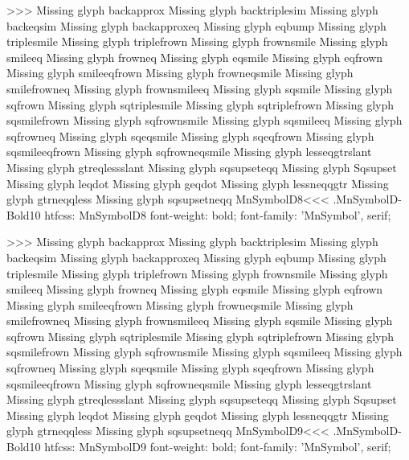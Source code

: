 >>>
Missing glyph	backapprox
Missing glyph	backtriplesim
Missing glyph	backeqsim
Missing glyph	backapproxeq
Missing glyph	eqbump
Missing glyph	triplesmile
Missing glyph	triplefrown
Missing glyph	frownsmile
Missing glyph	smileeq
Missing glyph	frowneq
Missing glyph	eqsmile
Missing glyph	eqfrown
Missing glyph	smileeqfrown
Missing glyph	frowneqsmile
Missing glyph	smilefrowneq
Missing glyph	frownsmileeq
Missing glyph	sqsmile
Missing glyph	sqfrown
Missing glyph	sqtriplesmile
Missing glyph	sqtriplefrown
Missing glyph	sqsmilefrown
Missing glyph	sqfrownsmile
Missing glyph	sqsmileeq
Missing glyph	sqfrowneq
Missing glyph	sqeqsmile
Missing glyph	sqeqfrown
Missing glyph	sqsmileeqfrown
Missing glyph	sqfrowneqsmile
Missing glyph	lesseqgtrslant
Missing glyph	gtreqlessslant
Missing glyph	sqsupseteqq
Missing glyph	Sqsupset
Missing glyph	leqdot
Missing glyph	geqdot
Missing glyph	lessneqqgtr
Missing glyph	gtrneqqless
Missing glyph	sqsupsetneqq
\<MnSymbolD8\><<<
.MnSymbolD-Bold10
htfcss:  MnSymbolD8  font-weight: bold; font-family: 'MnSymbol', serif;

>>>
Missing glyph	backapprox
Missing glyph	backtriplesim
Missing glyph	backeqsim
Missing glyph	backapproxeq
Missing glyph	eqbump
Missing glyph	triplesmile
Missing glyph	triplefrown
Missing glyph	frownsmile
Missing glyph	smileeq
Missing glyph	frowneq
Missing glyph	eqsmile
Missing glyph	eqfrown
Missing glyph	smileeqfrown
Missing glyph	frowneqsmile
Missing glyph	smilefrowneq
Missing glyph	frownsmileeq
Missing glyph	sqsmile
Missing glyph	sqfrown
Missing glyph	sqtriplesmile
Missing glyph	sqtriplefrown
Missing glyph	sqsmilefrown
Missing glyph	sqfrownsmile
Missing glyph	sqsmileeq
Missing glyph	sqfrowneq
Missing glyph	sqeqsmile
Missing glyph	sqeqfrown
Missing glyph	sqsmileeqfrown
Missing glyph	sqfrowneqsmile
Missing glyph	lesseqgtrslant
Missing glyph	gtreqlessslant
Missing glyph	sqsupseteqq
Missing glyph	Sqsupset
Missing glyph	leqdot
Missing glyph	geqdot
Missing glyph	lessneqqgtr
Missing glyph	gtrneqqless
Missing glyph	sqsupsetneqq
\<MnSymbolD9\><<<
.MnSymbolD-Bold10
htfcss:  MnSymbolD9  font-weight: bold; font-family: 'MnSymbol', serif;

